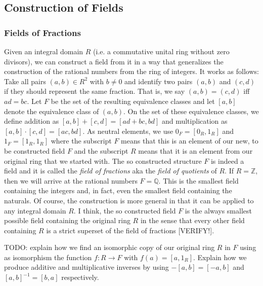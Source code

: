 


\subsection{Construction of Fields}


\subsubsection{Fields of Fractions}
Given an integral domain $R$ (i.e. a commutative unital ring without zero divisors), we can construct a field from it in a way that generalizes the construction of the rational numbers from the ring of integers. It works as follows: Take all pairs $(a,b) \in R^2$ with $b \neq 0$ and identify two pairs $(a,b)$ and $(c,d)$ if they should represent the same fraction. That is, we say $(a,b) = (c,d)$ iff $a d = b c$. Let $F$ be the set of the resulting equivalence classes and let $[a,b]$ denote the equivalence class of $(a,b)$. On the set of these equivalence classes, we define addition as $[a,b] + [c,d] = [a d + bc, bd]$ and multiplication as  $[a,b] \cdot [c,d] = [ac, bd]$. As neutral elements, we use $0_F = [0_R, 1_R]$ and $1_F = [1_R, 1_R]$ where the subscript $F$ means that this is an element of our new, to be constructed field $F$ and the subscript $R$ means that it is an element from our original ring that we started with. The so constructed structure $F$ is indeed a field and it is called the \emph{field of fractions} aka the \emph{field of quotients} of $R$. If $R = \mathbb{Z}$, then we will arrive at the rational numbers $F = \mathbb{Q}$. This is the smallest field containing the integers and, in fact, even the smallest field containing the naturals. Of course, the construction is more general in that it can be applied to any integral domain $R$. I think, the so constructed field $F$ is the always smallest possible field containing the original ring $R$ in the sense that every other field containing $R$ is a strict superset of the field of fractions [VERIFY!].

TODO: explain how we find an isomorphic copy of our original ring $R$ in $F$ using as isomorphism the function $f: R \rightarrow F$ with $f(a) = [a,1_R]$. Explain how we produce additive and multiplicative inverses by using $-[a,b] = [-a, b]$ and $[a,b]^{-1} = [b,a]$ respectively.

